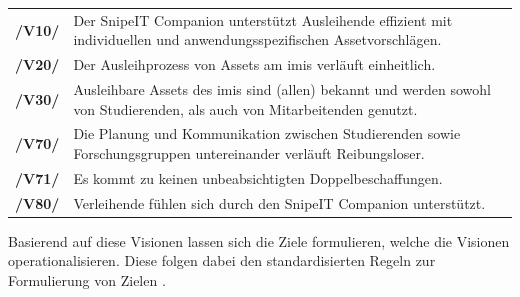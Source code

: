 \begin{center}
        \renewcommand{\arraystretch}{1.5}
        \begin{tabular}{p{}p{}}
                \hline
                \textbf{/V10/} & Der SnipeIT Companion unterstützt Ausleihende effizient mit
                individuellen und anwendungsspezifischen Assetvorschlägen.\\
                \textbf{/V20/} & Der Ausleihprozess von Assets am \ac{imis} verläuft einheitlich.\\
                \textbf{/V30/} & Ausleihbare Assets des \ac{imis} sind (allen) bekannt und werden sowohl von
                Studierenden, als auch von Mitarbeitenden genutzt.\\
                \textbf{/V70/} & Die Planung und Kommunikation zwischen Studierenden sowie
                Forschungsgruppen untereinander verläuft Reibungsloser.\\
                \textbf{/V71/} & Es kommt zu keinen unbeabsichtigten Doppelbeschaffungen.\\
                \textbf{/V80/} & Verleihende fühlen sich durch den SnipeIT Companion unterstützt.\\
                \hline
        \end{tabular}
\end{center}

Basierend auf diese Visionen lassen sich die Ziele formulieren, welche die Visionen
operationalisieren. Diese folgen dabei den standardisierten Regeln zur Formulierung von Zielen
\cite{pohl_requirements_2008}.


